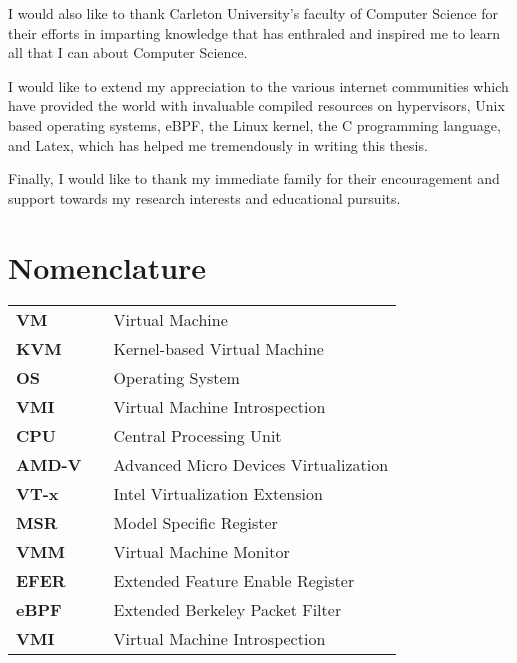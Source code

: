 \documentclass{report}
\begin{document}
\begin{spacing}{1.5}
{\large I would also like to thank Carleton University's faculty of Computer Science for their efforts in imparting knowledge that has enthraled and inspired me to learn all that I can about Computer Science.}

{\large I would like to extend my appreciation to the various internet communities which have provided the world with invaluable compiled resources on hypervisors, Unix based operating systems, eBPF, the Linux kernel, the C programming language, and Latex, which has helped me tremendously in writing this thesis.}

{\large Finally, I would like to thank my immediate family for their encouragement and support towards my research interests and educational pursuits.}

\tableofcontents












\newpage
\chapter*{Nomenclature}

\begin{tabular}{lcl}
\large{\bf VM}  & & \large{Virtual Machine} \\
\large{\bf KVM}  & & \large{Kernel-based Virtual Machine} \\
\large{\bf OS}   & & \large{Operating System}        \\
\large{\bf VMI}  & & \large{Virtual Machine Introspection} \\
\large{\bf CPU}  & & \large{Central Processing Unit} \\
\large{\bf AMD-V}  & & \large{Advanced Micro Devices Virtualization} \\
\large{\bf VT-x}  & & \large{Intel Virtualization Extension} \\
\large{\bf MSR}  & & \large{Model Specific Register} \\
\large{\bf VMM}  & & \large{Virtual Machine Monitor} \\
\large{\bf EFER}  & & \large{Extended Feature Enable Register} \\
\large{\bf eBPF}  & & \large{Extended Berkeley Packet Filter} \\
\large{\bf VMI}  & & \large{Virtual Machine Introspection} \\
\end{tabular}















\end{spacing}
\end{document}
